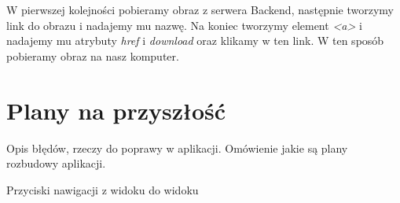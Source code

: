 W pierwszej kolejności pobieramy obraz z serwera Backend, następnie tworzymy link do obrazu i nadajemy mu nazwę. Na koniec tworzymy element \textit{<a>} i nadajemy mu atrybuty \textit{href} i \textit{download} oraz klikamy w ten link. W ten sposób pobieramy obraz na nasz komputer. 









\section{Plany na przyszłość} \label{sec:plans}

Opis błędów, rzeczy do poprawy w aplikacji. Omówienie jakie są plany rozbudowy aplikacji.

Przyciski nawigacji z widoku do widoku